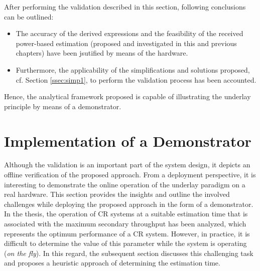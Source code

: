 After performing the validation described in this section, following conclusions can be outlined: 
\begin{itemize}
\item The accuracy of the derived expressions and the feasibility of the received power-based estimation (proposed and investigated in this and previous chapters) have been jsutified by means of the hardware.
\item Furthermore, the applicability of the simplifications and solutions proposed, cf. Section \ref{ssec:simp1}, to perform the validation process has been accounted.    
\end{itemize}
Hence, the analytical framework proposed is capable of illustrating the underlay principle by means of a demonstrator.

\section{Implementation of a Demonstrator}
\label{demo}
Although the validation is an important part of the system design, it depicts an offline verification of the proposed approach. From a deployment perspective, it is interesting to demonstrate the online operation of the underlay paradigm on a real hardware. This section provides the insights and outline the involved challenges while deploying the proposed approach in the form of a demonstrator. In the thesis, the operation of CR systems at a suitable estimation time that is associated with the maximum secondary throughput has been analyzed, which represents the optimum performance of a CR system. However, in practice, it is difficult to determine the value of this parameter while the system is operating (\textit{on the fly}). In this regard, the subsequent section discusses this challenging task and proposes a heuristic approach of determining the estimation time. 


